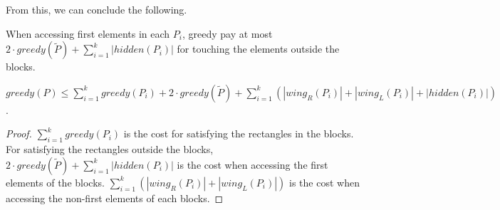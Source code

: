 From this, we can conclude the following.

\begin{theorem}
When accessing first elements in each $P_{i}$, greedy pay at most
$2\cdot greedy(\tilde{P})+\sum_{i=1}^{k}|hidden(P_{i})|$ for touching
the elements outside the blocks.\end{theorem}
\begin{corollary}
$greedy(P)\le\sum_{i=1}^{k}greedy(P_{i})+2\cdot greedy(\tilde{P})+\sum_{i=1}^{k}(|wing_{R}(P_{i})|+|wing_{L}(P_{i})|+|hidden(P_{i})|)$.\end{corollary}
\begin{proof}
$\sum_{i=1}^{k}greedy(P_{i})$ is the cost for satisfying the rectangles
in the blocks. For satisfying the rectangles outside the blocks, $2\cdot greedy(\tilde{P})+\sum_{i=1}^{k}|hidden(P_{i})|$
is the cost when accessing the first elements of the blocks. $\sum_{i=1}^{k}(|wing_{R}(P_{i})|+|wing_{L}(P_{i})|)$
is the cost when accessing the non-first elements of each blocks.
\end{proof}

\fi





